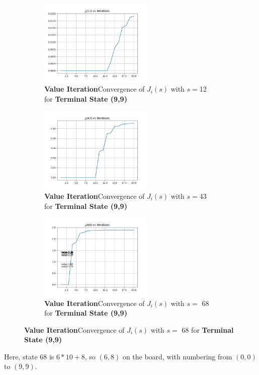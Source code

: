 \begin{figure}[h]
\begin{subfigure}
\centering
\includegraphics[angle=0,width=0.6\textwidth]{hw4/logs/value_iter_t=99_N=20/convergence-till-20-state-12.png}
\caption{ \textbf{Value Iteration}Convergence of $J_i(s)$ with $s =$12 for \textbf{Terminal State (9,9)}}
\end{subfigure}

\begin{subfigure}
\centering
\includegraphics[angle=0,width=0.6\textwidth]{hw4/logs/value_iter_t=99_N=20/convergence-till-20-state-43.png}
\caption{ \textbf{Value Iteration}Convergence of $J_i(s)$ with $s =$43 for \textbf{Terminal State (9,9)}}
\end{subfigure}

\begin{subfigure}
\centering
\includegraphics[angle=0,width=0.6\textwidth]{hw4/logs/value_iter_t=99_N=20/convergence-till-20-state-68.png}
\caption{ \textbf{Value Iteration}Convergence of $J_i(s)$ with $s =$ 68 for \textbf{Terminal State (9,9)}}
\end{subfigure}
\end{figure}
Here, state $68$ is $6 * 10 + 8$, so $(6,8)$ on the board, with numbering from $(0,0)$ to $(9,9)$.

